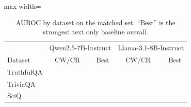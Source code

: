 \begin{table}[t]
\centering
\footnotesize
\caption{AUROC by dataset on the matched set. ``Best'' is the strongest text only baseline overall.}
\label{tab:datasets}
\begin{adjustbox}{max width=\columnwidth}
\begin{tabular}{lrccrcc}
\toprule
 & \multicolumn{3}{c}{Qwen2.5-7B-Instruct} & \multicolumn{3}{c}{Llama-3.1-8B-Instruct} \\
Dataset & CW/CR & \dfr{} & Best & CW/CR & \dfr{} & Best \\
\midrule
TruthfulQA & \TODO{} & \TODO{} & \TODO{} & \TODO{} & \TODO{} & \TODO{} \\
TriviaQA & \TODO{} & \TODO{} & \TODO{} & \TODO{} & \TODO{} & \TODO{} \\
SciQ & \TODO{} & \TODO{} & \TODO{} & \TODO{} & \TODO{} & \TODO{} \\
\bottomrule
\end{tabular}
\end{adjustbox}
\end{table}
